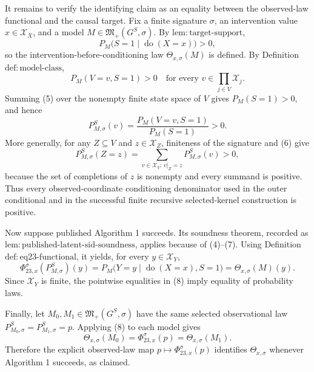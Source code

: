 It remains to verify the identifying claim as an equality between the observed-law functional and the causal target.  Fix a finite signature \(\sigma\), an intervention value \(x\in\mathcal X_X\), and a model \(M\in\mathfrak M_+(G^S,\sigma)\).  By \(\mathrm{lem:target\text{-}support}\),
\[
  P_M\bigl(S=1\mid\operatorname{do}(X=x)\bigr)>0, \tag{4}
\]
so the intervention-before-conditioning law \(\Theta_{x,\sigma}(M)\) is defined.  By Definition \(\mathrm{def:model\text{-}class}\),
\[
  P_M(V=v,S=1)>0
  \quad\text{for every }v\in\prod_{j\in V}\mathcal X_j. \tag{5}
\]
Summing (5) over the nonempty finite state space of \(V\) gives \(P_M(S=1)>0\), and hence
\[
  P_{M,\sigma}^S(v)
  =\frac{P_M(V=v,S=1)}{P_M(S=1)}>0. \tag{6}
\]
More generally, for any \(Z\subseteq V\) and \(z\in\mathcal X_Z\), finiteness of the signature and (6) give
\[
  P_{M,\sigma}^S(Z=z)
  =\sum_{v\in\mathcal X_V:\,v|_Z=z}P_{M,\sigma}^S(v)>0, \tag{7}
\]
because the set of completions of \(z\) is nonempty and every summand is positive.  Thus every observed-coordinate conditioning denominator used in the outer conditional and in the successful finite recursive selected-kernel construction is positive.

Now suppose published Algorithm 1 succeeds.  Its soundness theorem, recorded as \(\mathrm{lem:published\text{-}latent\text{-}sid\text{-}soundness}\), applies because of (4)--(7).  Using Definition \(\mathrm{def:eq23\text{-}functional}\), it yields, for every \(y\in\mathcal X_Y\),
\[
 \Phi_{23,x}^{\sigma}(P_{M,\sigma}^S)(y)
 =P_M\bigl(Y=y\mid\operatorname{do}(X=x),S=1\bigr)
 =\Theta_{x,\sigma}(M)(y). \tag{8}
\]
Since \(\mathcal X_Y\) is finite, the pointwise equalities in (8) imply equality of probability laws.

Finally, let \(M_0,M_1\in\mathfrak M_+(G^S,\sigma)\) have the same selected observational law \(P_{M_0,\sigma}^S=P_{M_1,\sigma}^S=p\).  Applying (8) to each model gives
\[
  \Theta_{x,\sigma}(M_0)
  =\Phi_{23,x}^{\sigma}(p)
  =\Theta_{x,\sigma}(M_1). \tag{9}
\]
Therefore the explicit observed-law map \(p\mapsto\Phi_{23,x}^{\sigma}(p)\) identifies \(\Theta_{x,\sigma}\) whenever Algorithm 1 succeeds, as claimed.